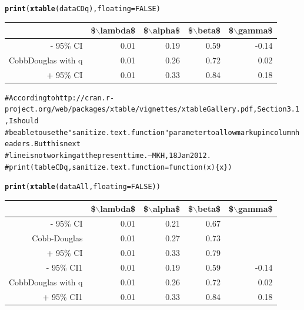 \documentclass[preprint,authoryear,12pt]{elsarticle}\usepackage{graphicx, color}
\makeatletter
\newcommand{\hlfunctioncall}[1]{\textcolor[rgb]{0.501960784313725,0,0.329411764705882}{\textbf{#1}}}%
\newcommand{\hlcomment}[1]{\textcolor[rgb]{0.180392156862745,0.6,0.341176470588235}{#1}}%
\newenvironment{kframe}{%
 \def\at@end@of@kframe{}%
 \ifinner\ifhmode%
  \def\at@end@of@kframe{\end{minipage}}%
  \begin{minipage}{\columnwidth}%
 \fi\fi%
 \def\FrameCommand##1{\hskip\@totalleftmargin \hskip-\fboxsep
 \colorbox{shadecolor}{##1}\hskip-\fboxsep
     \hskip-\linewidth \hskip-\@totalleftmargin \hskip\columnwidth}%
 \MakeFramed {\advance\hsize-\width
   \@totalleftmargin\z@ \linewidth\hsize
   \@setminipage}}%
 {\par\unskip\endMakeFramed%
 \at@end@of@kframe}
\makeatother
\begin{document}
\begin{kframe}
\begin{alltt}
\hlfunctioncall{print}(\hlfunctioncall{xtable}(dataCDq), floating=FALSE)
\end{alltt}
\end{kframe}%
\begin{tabular}{rrrrr}
  \hline
 & \$$\backslash$lambda\$ & \$$\backslash$alpha\$ & \$$\backslash$beta\$ & \$$\backslash$gamma\$ \\ 
  \hline
- 95\% CI & 0.01 & 0.19 & 0.59 & -0.14 \\ 
  CobbDouglas with q & 0.01 & 0.26 & 0.72 & 0.02 \\ 
  + 95\% CI & 0.01 & 0.33 & 0.84 & 0.18 \\ 
   \hline
\end{tabular}
\begin{kframe}\begin{alltt}
\hlcomment{# According to http://cran.r-project.org/web/packages/xtable/vignettes/xtableGallery.pdf, Section 3.1, I should }
\hlcomment{# be able to use the "sanitize.text.function" parameter to allow markup in column headers. But this next}
\hlcomment{# line is not working at the present time. --MKH, 18 Jan 2012.}
\hlcomment{# print(tableCDq, sanitize.text.function = function(x)\{x\})}

\hlfunctioncall{print}(\hlfunctioncall{xtable}(dataAll, floating=FALSE))
\end{alltt}
\end{kframe}%
\begin{table}[ht]
\begin{center}
\begin{tabular}{rrrrr}
  \hline
 & \$$\backslash$lambda\$ & \$$\backslash$alpha\$ & \$$\backslash$beta\$ & \$$\backslash$gamma\$ \\ 
  \hline
- 95\% CI & 0.01 & 0.21 & 0.67 &  \\ 
  Cobb-Douglas & 0.01 & 0.27 & 0.73 &  \\ 
  + 95\% CI & 0.01 & 0.33 & 0.79 &  \\ 
  - 95\% CI1 & 0.01 & 0.19 & 0.59 & -0.14 \\ 
  CobbDouglas with q & 0.01 & 0.26 & 0.72 & 0.02 \\ 
  + 95\% CI1 & 0.01 & 0.33 & 0.84 & 0.18 \\ 
   \hline
\end{tabular}
\end{center}
\end{table}
\end{document}
